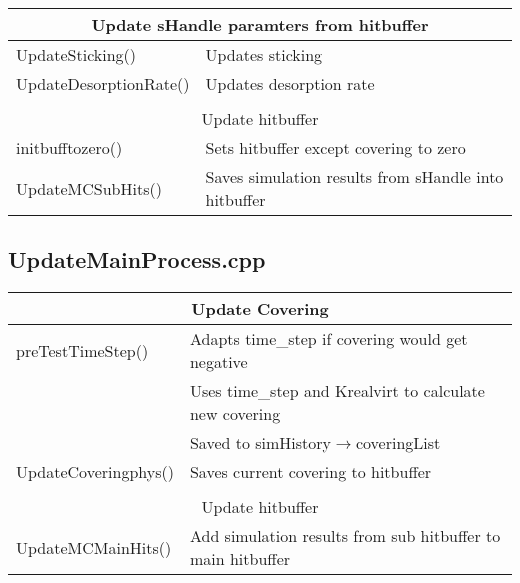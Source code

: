 \begin{center}
\begin{tabular}{|l|l|}
\hline
\multicolumn{2}{|c|}{\rule{0pt}{3ex}Update sHandle paramters from hitbuffer}\\
\hline
\rule{0pt}{3ex} UpdateSticking()& Updates sticking\\
\rule{0pt}{3ex} UpdateDesorptionRate()& Updates desorption rate \\
\hline
\multicolumn{2}{l}{}\\[1ex]
\hline
\multicolumn{2}{|c|}{\rule{0pt}{3ex}Update hitbuffer}\\
\hline
\rule{0pt}{3ex} initbufftozero()& Sets hitbuffer except covering to zero\\
\rule{0pt}{3ex} UpdateMCSubHits()& Saves simulation results from sHandle into hitbuffer\\
\hline
\end{tabular}
\end{center}
\newpage
\subsection{UpdateMainProcess.cpp}
\begin{center}
\begin{tabular}{|l|l|}
\hline
\multicolumn{2}{|c|}{\rule{0pt}{3ex}Update Covering}\\
\hline
\rule{0pt}{3ex} preTestTimeStep()& Adapts time\_step if covering would get negative\\
\rule{0pt}{3ex} \multirow{2}{*}{UpdateCovering()}& Uses time\_step and Krealvirt to calculate new covering\\
& Saved to simHistory$\rightarrow$coveringList\\
\rule{0pt}{3ex} UpdateCoveringphys()& Saves current covering to hitbuffer\\
\hline
\multicolumn{2}{l}{}\\[1ex]
\hline
\multicolumn{2}{|c|}{\rule{0pt}{3ex}Update hitbuffer}\\
\hline
\rule{0pt}{3ex} UpdateMCMainHits()& Add simulation results from sub hitbuffer to main hitbuffer\\
\hline
\end{tabular}
\end{center}


